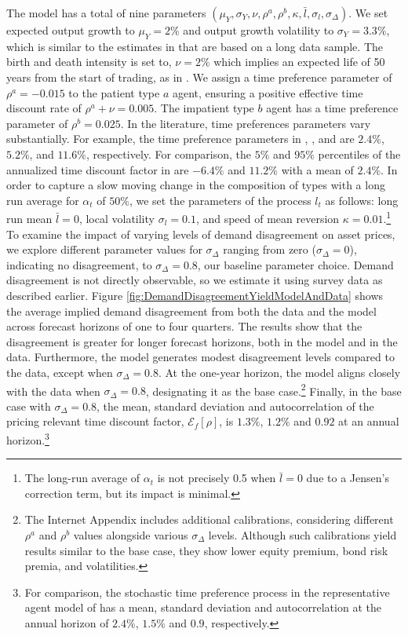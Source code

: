 \documentclass[preprint,11pt,authoryear]{elsarticle}
\theoremstyle{plain}
\begin{document}
The model has a total of nine parameters $\left(\mu_Y, \sigma_Y, \nu, \rho^a, \rho^b, \kappa, \bar{l}, \sigma_l, \sigma_{\Delta}\right)$. We set expected output growth to $\mu_Y=2\%$ and output growth volatility to $\sigma_Y = 3.3\%$, which is similar to the estimates in \cite{campbell-cochrane:99} that are based on a long data sample. The birth and death intensity is set to, $\nu = 2\%$  which implies an expected life of 50 years from the start of trading, as in  \cite{Garleanu2008}. We assign a time preference parameter of $\rho^a = -0.015$ to the patient type $a$ agent, ensuring a positive effective time discount rate of $\rho^a + \nu = 0.005$. The impatient type $b$ agent has a time preference parameter of $\rho^b = 0.025$. In the literature, time preferences parameters vary substantially. For example, the time preference parameters in \cite{bansal-yaron:04}, \cite{chan-kogan:02},  and \cite{campbell-cochrane:99} are $2.4\%$, $5.2\%$, and $11.6\%$, respectively. For comparison, the $5\%$ and $95\%$ percentiles of the annualized time discount factor in \cite{ALBUQUERQUE2016} are $-6.4\%$ and $11.2\%$ with a mean of $2.4\%$. 
In order to capture a slow moving change in the composition of types with a long run average for $\alpha_t$ of $50\%$, we set the parameters of the process $l_t$ as follows: long run mean $\bar{l}=0$, local volatility $\sigma_l=0.1$, and speed of mean reversion $\kappa=0.01$.\footnote{The long-run average of $\alpha_t$ is not precisely 0.5 when $\bar{l}=0$ due to a Jensen's correction term, but its impact is minimal.} To examine the impact of varying levels of demand disagreement on asset prices, we explore different parameter values for $\sigma_{\Delta}$ ranging from zero ($\sigma_{\Delta}= 0$), indicating no disagreement, to $\sigma_{\Delta}= 0.8$, our baseline parameter choice. Demand disagreement is not directly observable, so we estimate it using survey data as described earlier. Figure \ref{fig:DemandDisagreementYieldModelAndData} shows the average implied demand disagreement from both the data and the model across forecast horizons of one to four quarters. The results show that the disagreement is greater for longer forecast horizons, both in the model and in the data. Furthermore, the model generates modest disagreement levels compared to the data, except when $\sigma_{\Delta}= 0.8$. At the one-year horizon, the model aligns closely with the data when $\sigma_{\Delta}= 0.8$, designating it as the base case.\footnote{The Internet Appendix includes additional calibrations, considering different $\rho^a$ and $\rho^b$ values alongside various $\sigma_{\Delta}$ levels. Although such calibrations yield results similar to the base case, they show lower equity premium, bond risk premia, and volatilities.} Finally, in the base case with $\sigma_{\Delta}= 0.8$, the mean, standard deviation and autocorrelation of the pricing relevant time discount factor, $\mathcal{E}_{f}\left [ \rho \right]$, is $1.3\%$, $1.2\%$ and $0.92$ at an annual horizon.\footnote{For comparison, the stochastic time preference process in the representative agent model of \cite{ALBUQUERQUE2016} has a mean, standard deviation and autocorrelation at the annual horizon of $2.4\%$, $1.5\%$ and $0.9$, respectively.}
\end{document}
